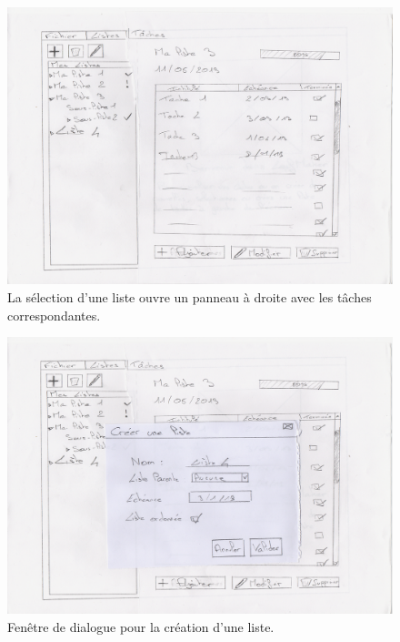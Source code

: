 		\begin{figure}[h!]
			\centering
		   \includegraphics[scale=1.5]{img/pp_ihm_3.png}
		   \caption{La sélection d'une liste ouvre un panneau à droite avec les tâches correspondantes.}
		\end{figure}
		\FloatBarrier

		\begin{figure}[h!]
			\centering
		   \includegraphics[scale=1.5]{img/pp_ihm_4.png}
		   \caption{Fenêtre de dialogue pour la création d'une liste.}
		\end{figure}
		\FloatBarrier
	
